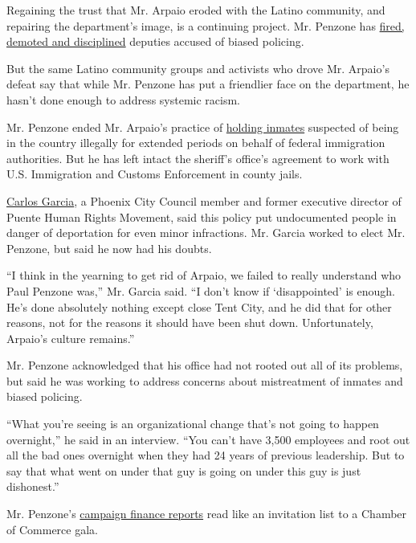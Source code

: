 Regaining the trust that Mr. Arpaio eroded with the Latino community,
and repairing the department's image, is a continuing project. Mr.
Penzone has
\href{https://ktar.com/story/2339892/sheriff-paul-penzone-said-hes-fired-employees-for-racial-profiling/}{fired,
demoted and disciplined} deputies accused of biased policing.

But the same Latino community groups and activists who drove Mr.
Arpaio's defeat say that while Mr. Penzone has put a friendlier face on
the department, he hasn't done enough to address systemic racism.

Mr. Penzone ended Mr. Arpaio's practice of
\href{https://www.azcentral.com/story/news/local/phoenix/2017/02/17/maricopa-county-sheriffs-office-courtesy-holds-federal-immigration-agents-ice/98072980/}{holding
inmates} suspected of being in the country illegally for extended
periods on behalf of federal immigration authorities. But he has left
intact the sheriff's office's agreement to work with U.S. Immigration
and Customs Enforcement in county jails.

\href{https://www.phoenix.gov/district8}{Carlos Garcia}, a Phoenix City
Council member and former executive director of Puente Human Rights
Movement, said this policy put undocumented people in danger of
deportation for even minor infractions. Mr. Garcia worked to elect Mr.
Penzone, but said he now had his doubts.

``I think in the yearning to get rid of Arpaio, we failed to really
understand who Paul Penzone was,'' Mr. Garcia said. ``I don't know if
`disappointed' is enough. He's done absolutely nothing except close Tent
City, and he did that for other reasons, not for the reasons it should
have been shut down. Unfortunately, Arpaio's culture remains.''

Mr. Penzone acknowledged that his office had not rooted out all of its
problems, but said he was working to address concerns about mistreatment
of inmates and biased policing.

``What you're seeing is an organizational change that's not going to
happen overnight,'' he said in an interview. ``You can't have 3,500
employees and root out all the bad ones overnight when they had 24 years
of previous leadership. But to say that what went on under that guy is
going on under this guy is just dishonest.''

Mr. Penzone's
\href{https://recorder.maricopa.gov/campaignfinance/campfinDocsresults.aspx?candidateid=1000885}{campaign
finance reports} read like an invitation list to a Chamber of Commerce
gala.

